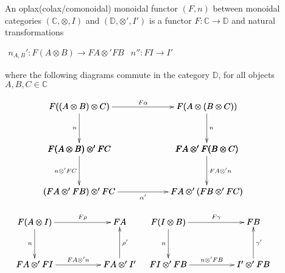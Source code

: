 \begin{definition}
\label{def:oplax_monoidal_functor}
    An oplax(colax/comonoidal) monoidal functor $(F,n)$ between monoidal categories $(\mathbb{C}, \otimes, I)$ and
    $(\mathbb{D}, \otimes ', I')$ is a functor $F:\mathbb{C} \rightarrow \mathbb{D}$ and natural transformations
    \begin{center}
        \begin{math}
            \begin{array}{lr}
                n_{A,B}' : F(A \otimes B) \rightarrow FA \otimes ' FB & n'' : FI \rightarrow I'
            \end{array}
        \end{math}
    \end{center}
    where the following diagrams commute in the category $\mathbb{D}$, for all objects $A,B,C \in \mathbb{C}$
    \begin{center}
        \begin{math}
            \begin{array}{c}
                \bfig
                \square|alrr|/->`->`->`/<1500,500>[
                    F((A \otimes B)\otimes C)`
                    F(A \otimes (B \otimes C))`
                    F(A \otimes B) \otimes ' FC`
                    FA \otimes ' F(B \otimes C);
                    F \alpha`
                    n`
                    n`
                ]
                \square(0,-500)|alrb|/`->`->`->/<1500,500>[
                    F(A \otimes B) \otimes ' FC`
                    FA \otimes ' F(B \otimes C)`
                    (FA \otimes ' FB) \otimes ' FC`
                    FA \otimes ' (FB \otimes ' FC);
                    `
                    n \otimes ' FC`
                    FA \otimes ' n`
                    \alpha '
                ]
                \efig
                \\\\
                \begin{array}{lr}
                    \bfig
                        \square|alra|/->`->`<-`->/<1000,500>[
                            F(A \otimes I)`
                            FA`
                            FA \otimes ' FI`
                            FA \otimes ' I';
                            F\rho`
                            n`
                            \rho '`
                            FA \otimes ' n
                        ]
                    \efig
                    &
                    \bfig
                        \square|alra|/->`->`<-`->/<1000,500>[
                            F(I \otimes B)`
                            FB`
                            FI \otimes ' FB`
                            I' \otimes ' FB;
                            F\gamma`
                            n`
                            \gamma '`
                            n \otimes ' FB
                        ]
                    \efig
                \end{array}
            \end{array}
        \end{math}
    \end{center}
    \cite{mellies2009}
\end{definition}